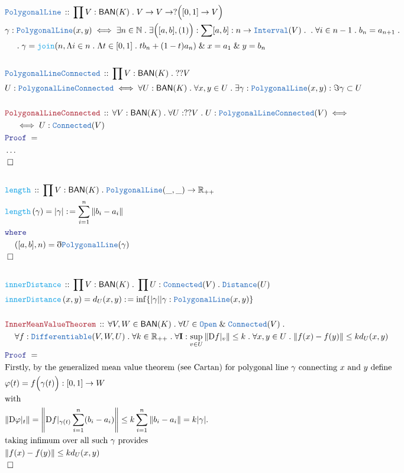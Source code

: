 \documentclass[12pt]{scrartcl}
\newcommand{\TYPE}[1]{\textcolor{NavyBlue}{\mathtt{#1}}}
\newcommand{\FUNC}[1]{\textcolor{Cerulean}{\mathtt{#1}}}
\newcommand{\LOGIC}[1]{\textcolor{Blue}{\mathtt{#1}}}
\newcommand{\THM}[1]{\textcolor{Maroon}{\mathtt{#1}}}
\renewcommand{\.}{\; . \;}
\newcommand{\de}{: \kern 0.1pc =}
\newcommand{\Act}[1]{\left( #1 \right)}
\newcommand{\Theorem}[2]{& \THM{#1} \, :: \, #2 \\ & \Proof = \\ }
\newcommand{\DeclareType}[2]{& \TYPE{#1} \, :: \, #2 \\}
\newcommand{\DefineType}[3]{& #1 : \TYPE{#2} \iff #3 \\}
\newcommand{\DeclareFunc}[2]{& \FUNC{#1} \, :: \, #2 \\}
\newcommand{\DefineNamedFunc}[4]{&  \FUNC{#1}\Act{#2} = #3 \de #4 \\}
\newcommand{\NewLine}{\\ & \kern 1pc}
\newcommand{\Page}[1]{\begin{align*} #1 \end{align*}   }
\newcommand{ \bd }{ \ByDef }
\newcommand{\NoProof}{ & \ldots \\ \EndProof}
\renewcommand{\And}{\; \& \;}
\newcommand{\Reals}{\mathbb{R} }
\newcommand{\Nat}{\mathbb{N} }
\newcommand{\QED}{\; \square}
\newcommand{\EndProof}{& \QED \\}
\newcommand{\ByDef}{\eth}
\newcommand{\Proof}{\LOGIC{Proof} \; }
\newcommand{\BAN}{\mathsf{BAN}} %
\newcommand{\D}{\mathrm{D}}
\begin{document}
\Page{
	\DeclareType{PolygonalLine}{ \prod V : \BAN(K) \. V \to V \to?\Big([0,1] \to V \Big)} 
	& \gamma : \TYPE{PolygonalLine}(x,y) \iff  \exists n \in \Nat \. \exists \Big([a,b], (1) \Big) : 
	\sum [a,b] : n \to \TYPE{Interval}(V)  \.
	\. \forall i \in n - 1  \. b_n = a_{n + 1} \. 
	\NewLine \.
	\gamma = \FUNC{join}( n, \Lambda i \in n \. \Lambda t \in [0,1] \. tb_n + (1 - t)a_n  ) 
	\And x = a_1 \And y = b_n \\
	\\
	\DeclareType{PolygonalLineConnected}{ \prod V : \BAN(K) \. ??V }
	\DefineType{U}{PolygonalLineConnected}{ \forall U : \BAN(K) \. \forall x,y \in U \. \exists \gamma : \TYPE{PolygonalLine}(x,y) :  \Im \gamma \subset U }
	\\
	\Theorem{PolygonalLineConnected}{ \forall V : \BAN(K) \. \forall U : ??V \. U : \TYPE{PolygonalLineConnected}(V) \iff
	\NewLine
	\iff U : \TYPE{Connected}(V)  }
	\NoProof
	\\
	\DeclareFunc{length}{ \prod V : \BAN(K) \. \TYPE{PolygonalLine}(\_,\_) \to \Reals_{++} }
	\DefineNamedFunc{length}{\gamma}{|\gamma|}{ \sum^n_{i = 1} \| b_i - a_i \| }
	& \LOGIC{where} \NewLine  ([a,b],n) = \bd \TYPE{PolygonalLine}(\gamma) \\
	\EndProof
	\\
	\DeclareFunc{innerDistance}{ \prod V : \BAN(K) \. \prod U : \TYPE{Connected}(V) \. \TYPE{Distance}(U)  }
	\DefineNamedFunc{innerDistance}{x,y}{ d_U(x,y) }{ \inf \{ |\gamma| | \gamma : \TYPE{PolygonalLine}(x,y) \}  }
	\\
	\Theorem{InnerMeanValueTheorem}{  
	\forall V,W \in \BAN(K) \. \forall U \in \TYPE{Open} \And \TYPE{Connected}(V) \. 
	\NewLine
	\forall f : \TYPE{Differentiable}(V,W,U) \. 
	\forall k \in \Reals_{++} \.
	\forall \mathbf{I}  : \sup_{v \in U} \|  \D f |_v  \| \le k \.
	\forall x,y \in U \. \| f(x) - f(y) \| \le k d_U(x,y)
	}
	& \textrm{Firstly, by the generalized mean value theorem (see Cartan)  for polygonal line $\gamma$ connecting $x$ and $y$ define } \\
	& \varphi(t) = f\Big(\gamma(t)\Big) : [0,1] \to W    \\
	& \textrm{with} \\
	& \| \D \varphi |_t \| = \left\| \D f |_{\gamma(t)} \sum^n_{i = 1} ( b_i - a_i ) \right\| 
		\le
		k \sum^n_{i = 1} \| b_i - a_i \| = k  | \gamma | .
	\\
	&  \textrm{taking infimum over all such $\gamma$ provides} \\
	&  \| f(x) - f(y) \| \le k d_U(x,y)\\
	\EndProof
}
\end{document}
